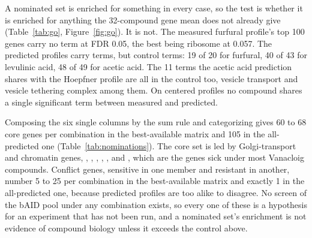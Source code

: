  A nominated set is
enriched for something in every case, so the test is whether it is enriched for anything
the 32-compound gene mean does not already give (Table~\ref{tab:go},
Figure~\ref{fig:go}). It is not. The measured furfural profile's top 100 genes carry no
term at FDR 0.05, the best being ribosome at 0.057. The predicted profiles carry terms,
but control terms: 19 of 20 for furfural, 40 of 43 for levulinic acid, 48 of 49 for
acetic acid. The 11 terms the acetic acid prediction shares with the Hoepfner profile are
all in the control too, vesicle transport and vesicle tethering complex among them. On
centered profiles no compound shares a single significant term between measured and
predicted.

\begin{table}[htbp]
\centering
\scriptsize
\caption[]{GO terms at FDR 0.05 over the top 100 most sensitive genes, for each compound
with a measured profile and for its compound-cold prediction. The control is the
build-002 gene mean over the 32 compounds, which is what a model with no
compound-specific signal outputs; the control columns are computed on raw profiles only.
A term in the predicted-and-control column is not evidence about the compound.}
\label{tab:go}

\end{table}


 Composing the six single columns by the
sum rule and categorizing gives 60 to 68 core genes per combination in the
best-available matrix and 105 in the all-predicted one (Table~\ref{tab:nominations}). The
core set is led by Golgi-transport and chromatin genes, , ,
, , ,  and , which are the genes
sick under most Vanacloig compounds. Conflict genes, sensitive in one member and
resistant in another, number 5 to 25 per combination in the best-available matrix and
exactly 1 in the all-predicted one, because predicted profiles are too alike to disagree.
No screen of the bAID pool under any combination exists, so every one of these is a
hypothesis for an experiment that has not been run, and a nominated set's enrichment is
not evidence of compound biology unless it exceeds the control above.

